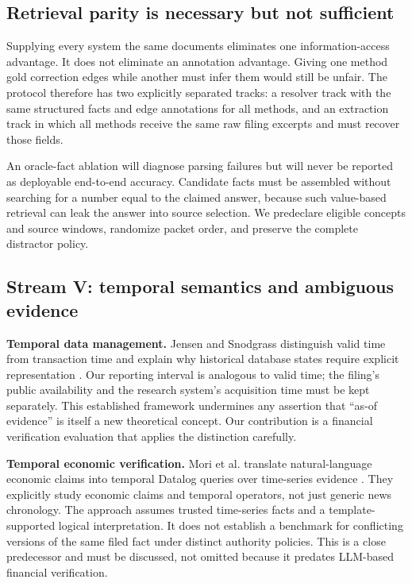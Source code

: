 \documentclass[11pt,a4paper]{article}
\newcommand{\pbreak}{\clearpage}
\newcommand{\lead}[1]{\textbf{\color{navy}#1}}
\begin{document}
\subsection{Retrieval parity is necessary but not sufficient}
Supplying every system the same documents eliminates one information-access advantage. It does not eliminate an annotation advantage. Giving one method gold correction edges while another must infer them would still be unfair. The protocol therefore has two explicitly separated tracks: a resolver track with the same structured facts and edge annotations for all methods, and an extraction track in which all methods receive the same raw filing excerpts and must recover those fields.

An oracle-fact ablation will diagnose parsing failures but will never be reported as deployable end-to-end accuracy. Candidate facts must be assembled without searching for a number equal to the claimed answer, because such value-based retrieval can leak the answer into source selection. We predeclare eligible concepts and source windows, randomize packet order, and preserve the complete distractor policy.

\pbreak
\subsection{Stream V: temporal semantics and ambiguous evidence}
\lead{Temporal data management.} Jensen and Snodgrass distinguish valid time from transaction time and explain why historical database states require explicit representation \cite{jensen}. Our reporting interval is analogous to valid time; the filing's public availability and the research system's acquisition time must be kept separately. This established framework undermines any assertion that “as-of evidence” is itself a new theoretical concept. Our contribution is a financial verification evaluation that applies the distinction carefully.

\lead{Temporal economic verification.} Mori et al. translate natural-language economic claims into temporal Datalog queries over time-series evidence \cite{mori}. They explicitly study economic claims and temporal operators, not just generic news chronology. The approach assumes trusted time-series facts and a template-supported logical interpretation. It does not establish a benchmark for conflicting versions of the same filed fact under distinct authority policies. This is a close predecessor and must be discussed, not omitted because it predates LLM-based financial verification.
\end{document}
